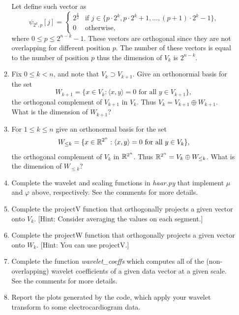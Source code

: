 \documentclass[12pt,twoside]{article}
\begin{document}
\begin{enumerate}
\begin{enumerate}
    Let define such vector as
  \begin{equation*}
  \psi_{2^{k},p}[j] =
  \begin{cases}
    2^{\frac{k}{2}} & \text{if $j\in\{p\cdot 2^k,p\cdot 2^k+1,\ldots,(p+1)\cdot2^{k}-1\}$,}\\
    0 & \text{otherwise,}
    \end{cases}       
\end{equation*}
 where $0 \leq p \leq 2^{n-k}-1$.
 These vectors are orthogonal since they are not overlapping for different position $p$.
 The number of these vectors is equal to the number of position $p$ thus the dimension of  $V_k$ is $2^{n-k}$.
 
  \item Fix $0\leq k < n$, and note that $V_k\supset V_{k+1}$.  Give an orthonormal basis for
    the set
    $$W_{k+1}=\{x\in V_k : \text{$\langle x,y\rangle = 0$ for all
      $y\in V_{k+1}$}\},$$
    the orthogonal complement of $V_{k+1}$ in $V_k$.  Thus
    $V_k=V_{k+1}\oplus W_{k+1}$. What is the
    dimension of $W_{k+1}$?
  \item For $1\leq k\leq n$ give an orthonormal basis for the set
    $$W_{\leq k}=\{x\in \mathbb{R}^{2^n} : \text{$\langle x,y\rangle = 0$ for all
      $y\in V_{k}$}\},$$
    the orthogonal complement of $V_{k}$ in $\mathbb{R}^{2^n}$.  Thus
    $\mathbb{R}^{2^n}=V_{k}\oplus W_{\leq k}$. What is the
    dimension of $W_{\leq k}$?
  \item Complete the wavelet and scaling functions in \emph{haar.py} that implement $\mu$
    and $\varphi$ above, respectively.  See the comments for more
    details.
  \item Complete the projectV function that orthogonally projects a
    given vector onto $V_k$. [Hint: Consider averaging the values on each segment.]
  \item Complete the projectW function that orthogonally projects a
    given vector onto $W_k$. [Hint: You can use projectV.]
  \item Complete the function \emph{wavelet\_coeffs}
    which computes all of the (non-overlapping) wavelet 
    coefficients of a given data vector at a given scale.  
    See the comments for more details.
    \item Report the plots generated by the code, which apply your wavelet transform to some electrocardiogram data.
    

\end{enumerate}
\end{enumerate}
\end{document}
